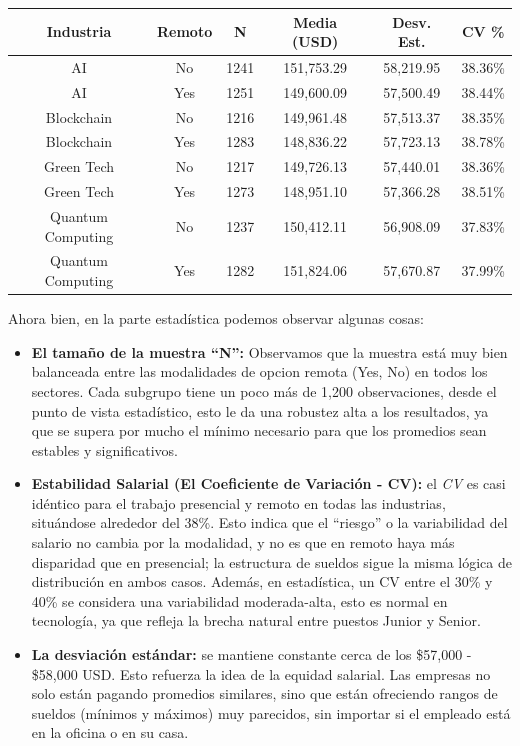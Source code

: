 \documentclass[oneside,11pt]{Latex/Classes/PhDthesisPSnPDF}
\begin{document}
\begin{longtable}[]{@{}cccccc@{}}
\toprule\noalign{}
Industria & Remoto & N & Media (USD) & Desv. Est. & CV \% \\
\midrule\noalign{}
\endhead
\bottomrule\noalign{}
\endlastfoot
AI & No & 1241 & 151,753.29 & 58,219.95 & 38.36\% \\
AI & Yes & 1251 & 149,600.09 & 57,500.49 & 38.44\% \\
Blockchain & No & 1216 & 149,961.48 & 57,513.37 & 38.35\% \\
Blockchain & Yes & 1283 & 148,836.22 & 57,723.13 & 38.78\% \\
Green Tech & No & 1217 & 149,726.13 & 57,440.01 & 38.36\% \\
Green Tech & Yes & 1273 & 148,951.10 & 57,366.28 & 38.51\% \\
Quantum Computing & No & 1237 & 150,412.11 & 56,908.09 & 37.83\% \\
Quantum Computing & Yes & 1282 & 151,824.06 & 57,670.87 & 37.99\% \\
\end{longtable}

Ahora bien, en la parte estadística podemos observar algunas cosas:

\begin{itemize}
\item
  \textbf{El tamaño de la muestra ``N'':} Observamos que la muestra está
  muy bien balanceada entre las modalidades de opcion remota (Yes, No)
  en todos los sectores. Cada subgrupo tiene un poco más de 1,200
  observaciones, desde el punto de vista estadístico, esto le da una
  robustez alta a los resultados, ya que se supera por mucho el mínimo
  necesario para que los promedios sean estables y significativos.
\item
  \textbf{Estabilidad Salarial (El Coeficiente de Variación - CV):} el
  \emph{CV} es casi idéntico para el trabajo presencial y remoto en
  todas las industrias, situándose alrededor del 38\%. Esto indica que
  el ``riesgo'' o la variabilidad del salario no cambia por la
  modalidad, y no es que en remoto haya más disparidad que en
  presencial; la estructura de sueldos sigue la misma lógica de
  distribución en ambos casos. Además, en estadística, un CV entre el
  30\% y 40\% se considera una variabilidad moderada-alta, esto es
  normal en tecnología, ya que refleja la brecha natural entre puestos
  Junior y Senior.
\item
  \textbf{La desviación estándar:} se mantiene constante cerca de los
  \$57,000 - \$58,000 USD. Esto refuerza la idea de la equidad salarial.
  Las empresas no solo están pagando promedios similares, sino que están
  ofreciendo rangos de sueldos (mínimos y máximos) muy parecidos, sin
  importar si el empleado está en la oficina o en su casa.
\end{itemize}
\end{document}
